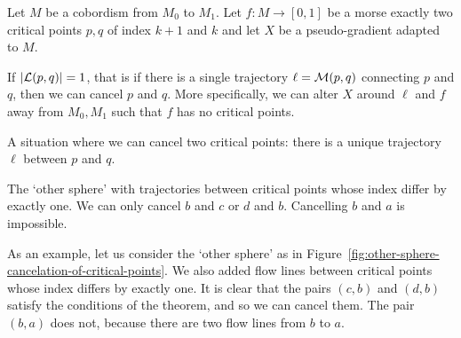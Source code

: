 \begin{theorem}
    Let $M$ be a cobordism from $M_0$ to $M_1$.
    Let $f: M \to  [0,1]$ be a morse exactly two critical points $p, q$ of index  $k+1$ and  $k$ and let $X$ be a pseudo-gradient adapted to $M$.

    If $|\mathcal L(p, q)| = 1$, that is if there is a single trajectory $\ell = \mathcal M(p, q)$ connecting $p$ and  $q$, then we can cancel $p$ and  $q$.
    More specifically, we can alter $X$ around  $\ell$ and $f$ away from  $M_0, M_1$ such that $f$ has no critical points.
\end{theorem}

\begin{marginfigure}
    \centering
    \caption{A situation where we can cancel two critical points: there is a unique trajectory $\ell$ between $p$ and $q$.}
    \label{fig:canellation-of-critical-points-situation}
\end{marginfigure}
\begin{marginfigure}
    \centering
    \caption{The `other sphere' with trajectories between critical points whose index differ by exactly one. We can only cancel $b$ and $c$ or $d$ and $b$. Cancelling $b$ and $a$ is impossible.}
    \label{fig:other-sphere-cancelation-of-critical-points}
\end{marginfigure}
\begin{eg}
    As an example, let us consider the `other sphere' as in Figure~\ref{fig:other-sphere-cancelation-of-critical-points}.
   We also added flow lines between critical points whose index differs by exactly one.
   It is clear that the pairs $(c,b)$ and $(d, b)$ satisfy the conditions of the theorem, and so we can cancel them.
   The pair $(b,a)$ does not, because there are two flow lines from $b$ to $a$.
\end{eg}

